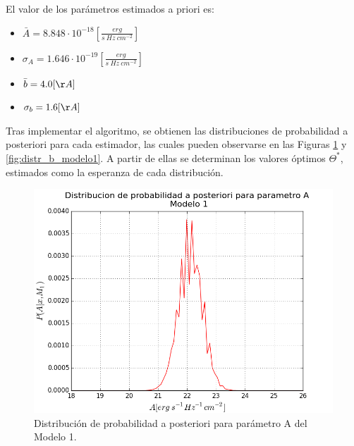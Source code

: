 \documentclass{article}
\begin{document}
El valor de los parámetros estimados a priori es:

\begin{itemize}
  \item $ \bar{A} = 8.848 \cdot 10^{-18} [\frac{erg}{s\ Hz\ cm^{-2}}]$
  
  \item $ \sigma_A = 1.646 \cdot 10^{-19} [\frac{erg}{s\ Hz\ cm^{-2}}]$
  
  \item $ \bar{b} = 4.0 [\AA] $
  
  \item $ \sigma_b = 1.6 [\AA] $
\end{itemize}

Tras implementar el algoritmo, se obtienen las distribuciones de probabilidad a posteriori para cada estimador, las cuales pueden observarse en las Figuras \ref{fig:distr_A_modelo1} y \ref{fig:distr_b_modelo1}. A partir de ellas se determinan los valores óptimos $\Theta^*$, estimados como la esperanza de cada distribución.

\begin{figure}[ht]
  \centering
  \includegraphics[scale = 0.5]{images/distr_A_modelo1.png}
  \caption{Distribución de probabilidad a posteriori para parámetro A del Modelo 1.}
  \label{fig:distr_A_modelo1}
\end{figure}
\end{document}
